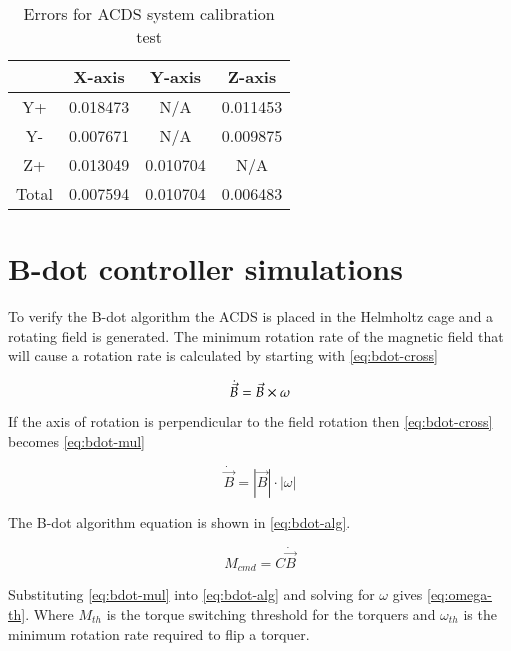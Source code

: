 \begin{table}[!ht]
    \centering
    \caption{Errors for \ac{ACDS} system calibration test}
    \label{tab:tcalMSPerr}
    \begin{tabular}{|c|c|c|c|}
        \hline
        &X-axis&Y-axis&Z-axis\\
        \hline
        Y+&0.018473&N/A&0.011453\\
        \hline
        Y-&0.007671&N/A&0.009875\\
        \hline
        Z+&0.013049&0.010704&N/A\\
        \hline
        Total&0.007594&0.010704&0.006483\\
        \hline
    \end{tabular}
\end{table}

\section{B-dot controller simulations}

To verify the B-dot algorithm the \ac{ACDS} is placed in the Helmholtz cage and a rotating field is generated. The minimum rotation rate of the magnetic field that will cause a rotation rate is calculated by starting with \cref{eq:bdot-cross}

\begin{equation}
    \dot{\vec{B}} = \vec{B} \times \omega
    \label{eq:bdot-cross}
\end{equation}

If the axis of rotation is perpendicular to the field rotation then \cref{eq:bdot-cross} becomes \cref{eq:bdot-mul}

\begin{equation}
    \dot{\vec{B}} = \left| \vec{B} \right| \cdot \left| \omega \right|
    \label{eq:bdot-mul}
\end{equation}

The B-dot algorithm equation is shown in \cref{eq:bdot-alg}.

\begin{equation}
    M_{cmd} = C \dot{\vec{B}} 
    \label{eq:bdot-alg}
\end{equation}

Substituting \cref{eq:bdot-mul} into \cref{eq:bdot-alg} and solving for $\omega$ gives \cref{eq:omega-th}. Where $M_{th}$ is the torque switching threshold for the torquers and $\omega_{th}$ is the minimum rotation rate required to flip a torquer.

